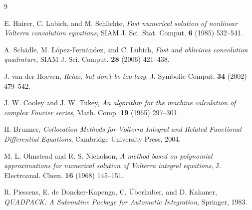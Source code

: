 \documentclass[11pt]{article}
\begin{document}
\begin{thebibliography}{9}

E. Hairer, C. Lubich, and M. Schlichte,
\emph{Fast numerical solution of nonlinear Volterra convolution
equations}, SIAM J. Sci. Stat. Comput. \textbf{6} (1985) 532--541.

A. Sch\"adle, M. L\'opez-Fern\'andez, and C. Lubich,
\emph{Fast and oblivious convolution quadrature},
SIAM J. Sci. Comput. \textbf{28} (2006) 421--438.

J. van der Hoeven, \emph{Relax, but don't be too lazy},
J. Symbolic Comput. \textbf{34} (2002) 479--542.

J. W. Cooley and J. W. Tukey, \emph{An algorithm for the machine
calculation of complex Fourier series},
Math. Comp. \textbf{19} (1965) 297--301.

H. Brunner, \emph{Collocation Methods for Volterra Integral and Related
Functional Differential Equations}, Cambridge University Press, 2004.

M. L. Olmstead and R. S. Nicholson,
\emph{A method based on polynomial approximations for numerical solution
of Volterra integral equations},
J. Electroanal. Chem. \textbf{16} (1968) 145--151.

R. Piessens, E. de Doncker-Kapenga, C. \"Uberhuber, and D. Kahaner,
\emph{QUADPACK: A Subroutine Package for Automatic Integration},
Springer, 1983.

\end{thebibliography}
\end{document}

